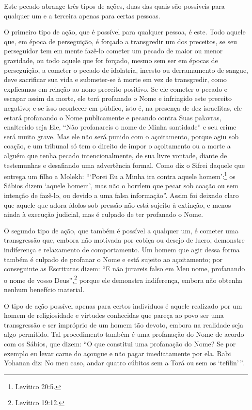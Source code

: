 Este pecado abrange três tipos de ações, duas das quais são possíveis
para qualquer um e a terceira apenas para certas pessoas.

O primeiro tipo de ação, que é possível para qualquer pessoa, é este.
Todo aquele que, em época de perseguição, é forçado a transgredir um dos
preceitos, se seu perseguidor tem em mente fazê-lo cometer um pecado de
maior ou menor gravidade, ou todo aquele que for forçado, mesmo sem ser
em épocas de perseguição, a cometer o pecado de idolatria, incesto ou
derramamento de sangue, deve sacrificar sua vida e submeter-se à morte
em vez de transgredir, como explicamos em relação ao nono preceito
positivo. Se ele cometer o pecado e escapar assim da morte, ele terá
profanado o Nome e infringido este preceito negativo; e se isso
acontecer em público, isto é, na presença de dez israelitas, ele estará
profanando o Nome publicamente e pecando contra Suas palavras,
enaltecido seja Ele, ``Não profanareis o nome de Minha santidade'' e seu
crime será muito grave. Mas ele não será punido com o açoitamento,
porque agiu sob coação, e um tribunal só tem o direito de impor o
açoitamento ou a morte a alguém que tenha pecado intencionalmente, de
sua livre vontade, diante de testemunhas e desafiando uma advertência
formal. Como diz o Sifrei daquele que entrega um filho a Molekh:
```Porei Eu a Minha ira contra aquele homem':\footnote{Levítico 20:5.} os Sábios
dizem `aquele homem', mas não o horrlem que pecar sob coação ou sem
intenção de fazê-lo, ou devido a uma falsa informação''. Assim foi
deixado claro que aquele que adora ídolos sob pressão não está sujeito à
extinção, e menos ainda à execução judicial, mas é culpado de ter
profanado o Nome.

O segundo tipo de ação, que também é possível a qualquer um, é cometer
uma transgressão que, embora não motivada por cobiça ou desejo de lucro,
demonstre indiferença e relaxamento de comportamento. Um homem que agir
dessa forma também é culpado de profanar o Nome e está sujeito ao
açoitamento; por conseguinte as Escrituras dizem: ``E não jurareis falso
em Meu nome, profanando o nome de vosso Deus'',\footnote{Levítico 19:12.} porque
ele demonstra indiferença, embora não obtenha nenhum benefício
material.

O tipo de ação possível apenas para certos indivíduos é aquele realizado
por um homem de religiosidade e virtudes conhecidas que pareça ao povo
ser uma transgressão e ser impróprio de um homem tão devoto, embora na
realidade seja algo permitido. Tal procedimento também é uma profanação
do Nome de acordo com os Sábios, que dizem: ``O que constitui uma
profanação do Nome? Se por exemplo eu levar carne do açougue e não
pagar imediatamente por ela. Rabi Yohanan diz: No meu caso, andar
quatro cúbitos sem a Torá ou sem os `tefilin'\,''.

